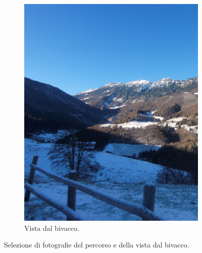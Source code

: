 \documentclass{article}
\begin{document}
\begin{figure}[htbp!]
\begin{subfigure}{0.45\textwidth}
        \includegraphics[width=\linewidth]{images/foto_vistaBivacco.jpg}
        \caption{Vista dal bivacco.}
        \label{fig:foto4}
    \end{subfigure}

    \caption{Selezione di fotografie del percorso e della vista dal bivacco.}
    \label{fig:panoramica_4_foto}
\end{figure}
\end{document}
